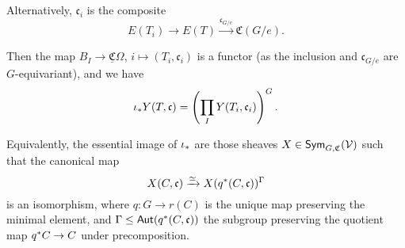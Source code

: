 \documentclass[a4paper,10pt
,draft
]{article}%
\newcommand{\UC}{\underline{\mathfrak C}}
\renewcommand{\1}{\ensuremath{\mathbb{id}}}
\begin{document}


{\color{blue} %
  Alternatively, $\mathfrak c_i$ is the composite
  \begin{equation}
        E(T_i) \to E(T) \xrightarrow{\mathfrak c_{G/e}} \mathfrak C(G/e).
  \end{equation}
} %

Then the map $B_I \to \UC\Omega$, $i \mapsto (T_i, \mathfrak c_i)$ is a functor
(as the inclusion and $\mathfrak c_{G/e}$ are $G$-equivariant),
and we have
\begin{equation}
      \iota_{\**}Y(T, \mathfrak c) =
      \left(
            \prod_I Y(T_i, \mathfrak c_i)
      \right)^G.
\end{equation}



\begin{remark}[{cf. \cite[Rem 4.35]{BP17}}]
      Equivalently, the essential image of $\iota_{\**}$ are those sheaves $X \in \mathsf{Sym}_{G, \mathfrak C}(\mathcal V)$ such that
      the canonical map
      \begin{equation}
            X(C,\mathfrak c) \xrightarrow{\simeq} X(q^{\**}(C, \mathfrak c))^\Gamma
      \end{equation}
      is an isomorphism, where $q: G \to r(C)$ is the unique map preserving the minimal element, and
      $\Gamma \leq \mathsf{Aut}(q^{\**}(C,\mathfrak c))$ the subgroup preserving the quotient map $q^{\**}C \to C$
      under precomposition.
\end{remark}

\end{document}
